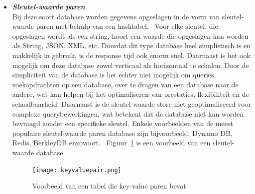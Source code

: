 \begin{itemize}
      \item \textbf{\textit{Sleutel-waarde paren}} \\
            Bij deze soort database worden gegevens opgeslagen in de vorm van sleutel-waarde paren met behulp van een hashtabel.~\autocite{Microsoft} 
            Voor elke sleutel, die opgeslagen wordt als een string, hoort een waarde die opgeslagen kan worden als String, JSON, XML, etc. Doordat dit type database heel simplistisch is en makkelijk in gebruik, is de response tijd ook enorm snel. Daarnaast is het ook mogelijk om deze database zowel verticaal als horizontaal te schalen. Door de simpliciteit van de database is het echter niet mogelijk om queries, zoekopdrachten op een database, over te dragen van een database naar de andere, wat kan helpen bij het optimaliseren van prestaties, flexibiliteit en de schaalbaarheid. Daarnaast is de sleutel-waarde store niet geoptimaliseerd voor complexe querybewerkingen, wat betekent dat de database niet kan worden bevraagd zonder een specifieke sleutel. Enkele voorbeelden van de meest populaire sleutel-waarde paren database zijn bijvoorbeeld: Dynamo DB, Redis, BerkleyDB enzovoort.~\autocite{DistributedDatabase2022} Figuur~\ref{fig:keyvaluepair} is een voorbeeld van een sleutel-waarde database.
            \begin{figure}[H]
                \centering
                \texttt{[image: keyvaluepair.png]}
                \caption[Voorbeeld van een tabel die key-value paren bevat]{Voorbeeld van een tabel die key-value paren bevat ~\autocite{DistributedDatabase2022}}\label{fig:keyvaluepair}
            \end{figure}
            

\end{itemize}
